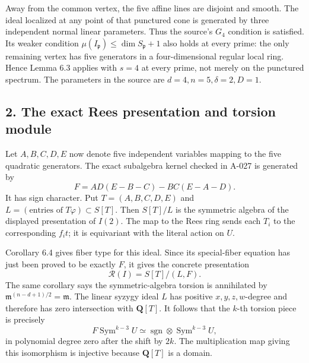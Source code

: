 \documentclass[
  10pt,
]{article}
\begin{document}
Away from the common vertex, the five affine lines are disjoint and
smooth. The ideal localized at any point of that punctured cone is
generated by three independent normal linear parameters. Thus the
source's \(G_4\) condition is satisfied. Its weaker condition
\(\mu(I_{\mathfrak p})\le\dim S_{\mathfrak p}+1\) also holds at every
prime: the only remaining vertex has five generators in a
four-dimensional regular local ring. Hence Lemma 6.3 applies with
\(s=4\) at every prime, not merely on the punctured spectrum. The
parameters in the source are \(d=4,n=5,\delta=2,D=1\).

\subsection{2. The exact Rees presentation and torsion
module}\label{the-exact-rees-presentation-and-torsion-module}

Let \(A,B,C,D,E\) now denote five independent variables mapping to the
five quadratic generators. The exact subalgebra kernel checked in A-027
is generated by \[
F=AD(E-B-C)-BC(E-A-D).
\] It has sign character. Put \(T=(A,B,C,D,E)\) and
\(L=(\text{entries of }T\varphi)\subset S[T]\). Then \(S[T]/L\) is the
symmetric algebra of the displayed presentation of \(I(2)\). The map to
the Rees ring sends each \(T_i\) to the corresponding \(f_i t\); it is
equivariant with the literal action on \(U\).

Corollary 6.4 gives fiber type for this ideal. Since its special-fiber
equation has just been proved to be exactly \(F\), it gives the concrete
presentation \[
\boxed{\mathcal R(I)=S[T]/(L,F).}
\] The same corollary says the symmetric-algebra torsion is annihilated
by \(\mathfrak m^{(n-d+1)/2}=\mathfrak m\). The linear syzygy ideal
\(L\) has positive \(x,y,z,w\)-degree and therefore has zero
intersection with \(\mathbf Q[T]\). It follows that the \(k\)-th torsion
piece is precisely \[
F\operatorname{Sym}^{k-3}U
\simeq\operatorname{sgn}\otimes\operatorname{Sym}^{k-3}U,
\] in polynomial degree zero after the shift by \(2k\). The
multiplication map giving this isomorphism is injective because
\(\mathbf Q[T]\) is a domain.
\end{document}
